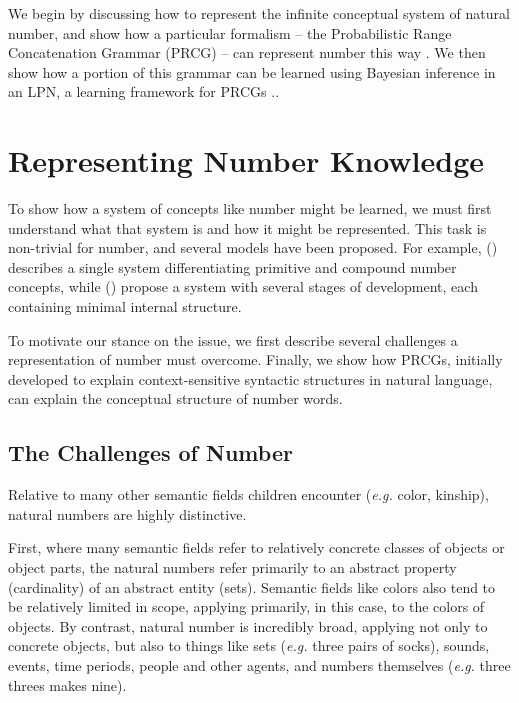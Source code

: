 \documentclass[10pt,letterpaper]{article}
\begin{document}
We begin by discussing how to represent the infinite conceptual system
of natural number, and show how a particular formalism -- the
Probabilistic Range Concatenation Grammar (PRCG) -- can represent
number this way \citep{boullier2005range}. We then show how a portion
of this grammar can be learned using Bayesian inference in an LPN, a
learning framework for PRCGs \citep{DecRulTen2015}..

\section{Representing Number Knowledge}

To show how a system of concepts like number might be learned, we must
first understand what that system is and how it might be represented.
This task is non-trivial for number, and several models have been
proposed. For example, \citeauthor{hurford1975linguistic}
(\citeyear{hurford1975linguistic}) describes a single system
differentiating primitive and compound number concepts, while
\citeauthor{siegler1982development}
(\citeyear{siegler1982development}) propose a system with several
stages of development, each containing minimal internal structure.

To motivate our stance on the issue, we first describe several
challenges a representation of number must overcome. Finally, we show
how PRCGs, initially developed to explain context-sensitive syntactic
structures in natural language, can explain the conceptual structure
of number words.

\subsection{The Challenges of Number}

Relative to many other semantic fields children encounter ({\it e.g.}
color, kinship), natural numbers are highly distinctive.

First, where many semantic fields refer to relatively concrete classes
of objects or object parts, the natural numbers refer primarily to an
abstract property (cardinality) of an abstract entity (sets). Semantic
fields like colors also tend to be relatively limited in scope,
applying primarily, in this case, to the colors of objects. By
contrast, natural number is incredibly broad, applying not only to
concrete objects, but also to things like sets ({\it e.g.} three pairs
of socks), sounds, events, time periods, people and other agents, and
numbers themselves ({\it e.g.} three threes makes nine).
\end{document}
